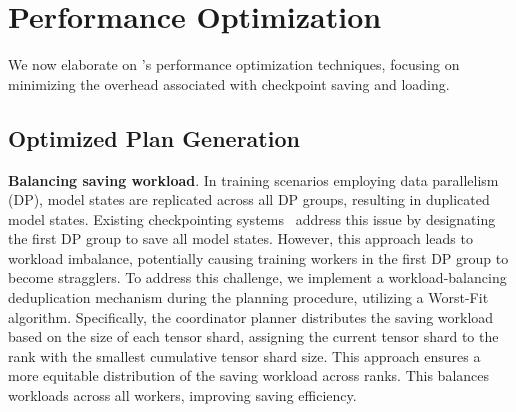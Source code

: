 \section{%
Performance Optimization}
\label{sec:io_optimization}
We now elaborate on \sys{}'s performance optimization techniques, focusing on minimizing the overhead associated with checkpoint saving and loading.

\subsection{Optimized Plan Generation}
\label{sec:opt_plan}
\noindent \textbf{Balancing saving workload}.
In training scenarios employing data parallelism (DP), model states are replicated across all DP groups, resulting in duplicated model states. Existing checkpointing systems~\cite{torch-dcp, megatron-dcp} address this issue by designating the first DP group to save all model states. However, this approach leads to workload imbalance, potentially causing training workers in the first DP group to become stragglers.
To address this challenge, we implement a workload-balancing deduplication mechanism during the planning procedure, utilizing a Worst-Fit algorithm. Specifically, the coordinator planner distributes the saving workload based on the size of each tensor shard, assigning the current tensor shard to the rank with the smallest cumulative tensor shard size. This approach ensures a more equitable distribution of the saving workload across ranks.
 This balances workloads across all workers, improving saving efficiency.
 

